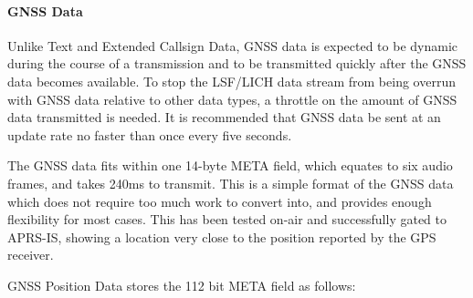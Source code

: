 \documentclass[a4paper,11pt]{book}
\begin{document}
\paragraph{GNSS Data}

Unlike Text and Extended Callsign Data, GNSS data is expected to be dynamic during the course of a transmission and to be transmitted quickly after the GNSS data becomes available. To stop the LSF/LICH data stream from being overrun with GNSS data relative to other data types, a throttle on the amount of GNSS data transmitted is needed. It is recommended that GNSS data be sent at an update rate no faster than once every five seconds.

The GNSS data fits within one 14-byte META field, which equates to six audio frames, and takes 240ms to transmit. This is a simple format of the GNSS data which does not require too much work to convert into, and provides enough flexibility for most cases. This has been tested on-air and successfully gated to APRS-IS, showing a location very close to the position reported by the GPS receiver.

GNSS Position Data stores the 112 bit META field as follows:
\end{document}
